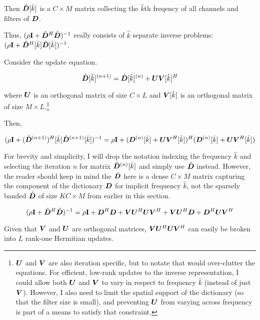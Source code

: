 Then $\hat{\bm{D}}[\hat{k}]$ is a $C \times M$ matrix collecting the $\hat{k}$th freqency of all channels and filters of $\bm{D}$.

Thus, $(\rho{\bf I} + \hat{\bm{D}}^H\hat{\bm{D}})^{-1}$ really consists of $\hat{k}$ separate inverse problems: $(\rho{\bf I} + \hat{\bm{D}}^H[\hat{k}]\hat{\bm{D}}[\hat{k}])^{-1}$.

Consider the update equation.

\begin{equation}
\hat{\bm{D}}[\hat{k}]^{(n + 1)} = \hat{\bm{D}}[\hat{k}]^{(n)} + \bm{U}\bm{V}[\hat{k}]^H
\end{equation}

where $\bm{U}$ is an orthogonal matrix of size $C \times L$ and $\bm{V}[\hat{k}]$ is an orthogonal matrix of size $M \times L$.\footnote{$\bm{U}$ and $\bm{V}$ are also iteration specific, but to notate that would over-clutter the equations. For efficient, low-rank updates to the inverse representation, I could allow both $\bm{U}$ and $\bm{V}$ to vary in respect to frequency $\hat{k}$ (instead of just $\bm{V}$). However, I also need to limit the spatial support of the dictionary (so that the filter size is small), and preventing $\bm{U}$ from varying across frequency is part of a means to satisfy that constraint.}

Then,

\begin{equation}
(\rho{\bf I} + (\hat{\bm{D}}^{(n + 1)})^H[\hat{k}]\hat{\bm{D}}^{(n + 1)}[\hat{k}])^{-1} = \rho{\bf I} + (\bm{D}^{(n)}[\hat{k}] + \bm{U}\bm{V}^H[\hat{k}])^H(\bm{D}^{(n)}[\hat{k}] + \bm{U}\bm{V}^H[\hat{k}])
\end{equation}

For brevity and simplicity, I will drop the notation indexing the frequency $\hat{k}$ and selecting the iteration $n$ for matrix $\hat{\bm{D}}^{(n)}[\hat{k}]$ and simply use $\hat{\bm{D}}$ instead. However, the reader should keep in mind the $\hat{\bm{D}}$ here is a dense $C \times M$ matrix capturing the component of the dictionary $\bm{D}$ for implicit frequency $\hat{k}$, not the sparsely banded $\hat{\bm{D}}$ of size $KC \times M$ from earlier in this section.

\begin{equation}
(\rho{\bf I} + \hat{\bm{D}}^H\hat{\bm{D}})^{-1} = \rho{\bf I} + \bm{D}^H\bm{D} + \bm{V}\bm{U}^H \bm{U}\bm{V}^H + \bm{V}\bm{U}^H\bm{D} + \bm{D}^H\bm{U}\bm{V}^H
\end{equation}

Given that $\bm{V}$ and $\bm{U}$ are orthogonal matrices, $\bm{V}\bm{U}^H\bm{U}\bm{V}^H$ can easily be broken into $L$ rank-one Hermitian updates.

